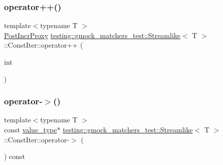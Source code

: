 \mbox{\label{classtesting_1_1gmock__matchers__test_1_1_streamlike_1_1_const_iter_a2c47b9a343e5360282885f6ac57afdb5}} 
\subsubsection{\texorpdfstring{operator++()}{operator++()}\hspace{0.1cm}{\footnotesize\ttfamily [2/2]}}
{\footnotesize\ttfamily template$<$typename T $>$ \\
\mbox{\hyperlink{classtesting_1_1gmock__matchers__test_1_1_streamlike_1_1_const_iter_1_1_post_incr_proxy}{Post\+Incr\+Proxy}} \mbox{\hyperlink{classtesting_1_1gmock__matchers__test_1_1_streamlike}{testing\+::gmock\+\_\+matchers\+\_\+test\+::\+Streamlike}}$<$ T $>$\+::Const\+Iter\+::operator++ (\begin{DoxyParamCaption}\item[{int}]{ }\end{DoxyParamCaption})\hspace{0.3cm}{\ttfamily [inline]}}

\mbox{\label{classtesting_1_1gmock__matchers__test_1_1_streamlike_1_1_const_iter_a639c3c1aba0cd794546eef5748acedfd}} 
\subsubsection{\texorpdfstring{operator-\/$>$()}{operator->()}}
{\footnotesize\ttfamily template$<$typename T $>$ \\
const \mbox{\hyperlink{classtesting_1_1gmock__matchers__test_1_1_streamlike_a7e2c2e021676c1ed5dea63cdd019661c}{value\+\_\+type}}$\ast$ \mbox{\hyperlink{classtesting_1_1gmock__matchers__test_1_1_streamlike}{testing\+::gmock\+\_\+matchers\+\_\+test\+::\+Streamlike}}$<$ T $>$\+::Const\+Iter\+::operator-\/$>$ (\begin{DoxyParamCaption}{ }\end{DoxyParamCaption}) const\hspace{0.3cm}{\ttfamily [inline]}}



